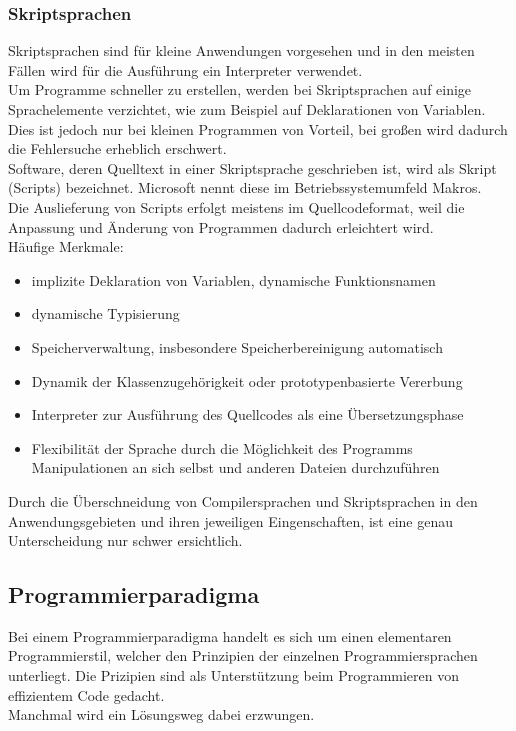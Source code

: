 \documentclass[12pt,a4paper]{report}
\begin{document}
\begin{onehalfspace}
\subsubsection{Skriptsprachen}
Skriptsprachen sind für kleine Anwendungen vorgesehen und in den meisten Fällen wird für die Ausführung ein Interpreter verwendet.\\
Um Programme schneller zu erstellen, werden bei Skriptsprachen auf einige Sprachelemente verzichtet, wie zum Beispiel auf Deklarationen von Variablen. Dies ist jedoch nur bei kleinen Programmen von Vorteil, bei großen wird dadurch die Fehlersuche erheblich erschwert.\\
Software, deren Quelltext in einer Skriptsprache geschrieben ist, wird als Skript (Scripts) bezeichnet. Microsoft nennt diese im Betriebssystemumfeld Makros.\\
Die Auslieferung von Scripts erfolgt meistens im Quellcodeformat, weil die Anpassung und Änderung von Programmen dadurch erleichtert wird.
\\Häufige Merkmale:
\begin{itemize}
\item implizite Deklaration von Variablen, dynamische Funktionsnamen
\item dynamische Typisierung
\item Speicherverwaltung, insbesondere Speicherbereinigung automatisch
\item Dynamik der Klassenzugehörigkeit oder prototypenbasierte Vererbung
\item Interpreter zur Ausführung des Quellcodes als eine Übersetzungsphase
\item Flexibilität der Sprache durch die Möglichkeit des Programms Manipulationen an sich selbst und anderen Dateien durchzuführen
\end{itemize}
Durch die Überschneidung von Compilersprachen und Skriptsprachen in den Anwendungsgebieten und ihren jeweiligen Eingenschaften, ist eine genau Unterscheidung nur schwer ersichtlich.

\subsection{Programmierparadigma}
Bei einem Programmierparadigma handelt es sich um einen elementaren Programmierstil, welcher den Prinzipien der einzelnen Programmiersprachen unterliegt. Die Prizipien sind als Unterstützung beim Programmieren von effizientem Code gedacht.
\\Manchmal wird ein Lösungsweg dabei erzwungen.\\


\end{onehalfspace}
\end{document}
